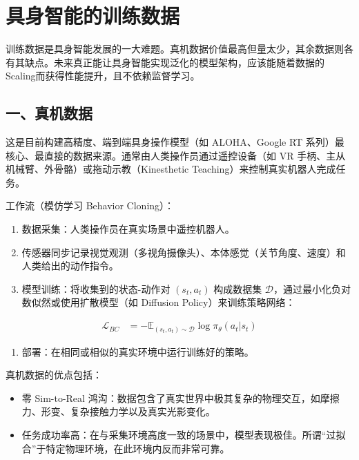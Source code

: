 \clearpage

\hypertarget{ux5177ux8eabux667aux80fdux7684ux8badux7ec3ux6570ux636e}{%
\section{具身智能的训练数据}\label{ux5177ux8eabux667aux80fdux7684ux8badux7ec3ux6570ux636e}}

训练数据是具身智能发展的一大难题。真机数据价值最高但量太少，其余数据则各有其缺点。未来真正能让具身智能实现泛化的模型架构，应该能随着数据的Scaling而获得性能提升，且不依赖监督学习。

\hypertarget{ux4e00ux771fux673aux6570ux636e}{%
\subsection{一、真机数据}\label{ux4e00ux771fux673aux6570ux636e}}

这是目前构建高精度、端到端具身操作模型（如 ALOHA、Google RT 系列）最核心、最直接的数据来源。通常由人类操作员通过遥控设备（如 VR 手柄、主从机械臂、外骨骼）或拖动示教（Kinesthetic Teaching）来控制真实机器人完成任务。

工作流（模仿学习 Behavior Cloning）：

\begin{enumerate}
\def\labelenumi{\arabic{enumi}.}
\tightlist
\item
  数据采集：人类操作员在真实场景中遥控机器人。
\item
  传感器同步记录视觉观测（多视角摄像头）、本体感觉（关节角度、速度）和人类给出的动作指令。
\item
  模型训练：将收集到的状态-动作对 \((s_t,a_t)\) 构成数据集 \(\mathcal{D}\)，通过最小化负对数似然或使用扩散模型（如 Diffusion Policy）来训练策略网络：
\end{enumerate}

\[
\begin{aligned}
\mathcal{L}_{BC}
&=
-\mathbb{E}_{(s_t,a_t)\sim\mathcal{D}}
\log \pi_\theta(a_t|s_t)
\end{aligned}
\]

\begin{enumerate}
\def\labelenumi{\arabic{enumi}.}
\setcounter{enumi}{3}
\tightlist
\item
  部署：在相同或相似的真实环境中运行训练好的策略。
\end{enumerate}

真机数据的优点包括：

\begin{itemize}
\tightlist
\item
  零 Sim-to-Real 鸿沟：数据包含了真实世界中极其复杂的物理交互，如摩擦力、形变、复杂接触力学以及真实光影变化。
\item
  任务成功率高：在与采集环境高度一致的场景中，模型表现极佳。所谓``过拟合''于特定物理环境，在此环境内反而非常可靠。
\end{itemize}

